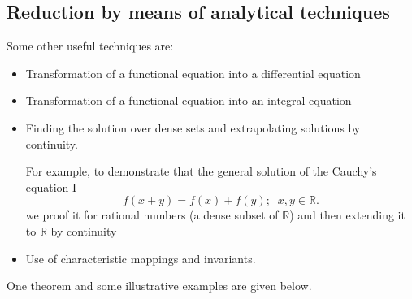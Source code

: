 \documentclass[
	11pt, %
	fleqn, %
	a4paper, %
]{LegrandOrangeBook}
\newcommand{\R}{\mathbb{R}}
\begin{document}
\subsection{Reduction by means of analytical techniques}\label{s2.10} Some other useful techniques are:
\begin{itemize}
\item Transformation of a functional equation into a differential equation

\item Transformation of a functional equation into an integral equation



\item Finding the solution over dense sets and extrapolating solutions by continuity.

For example, to demonstrate that the general solution
of the Cauchy's equation I
$$ f(x+y)=f(x)+f(y);\;\;x,y \in \R .$$
we proof it for rational numbers (a dense
subset of $\R$) and then extending it to $\R$ by continuity

\item Use of characteristic mappings and
invariants.
\end{itemize}

One theorem and some illustrative examples are given below.
\end{document}
